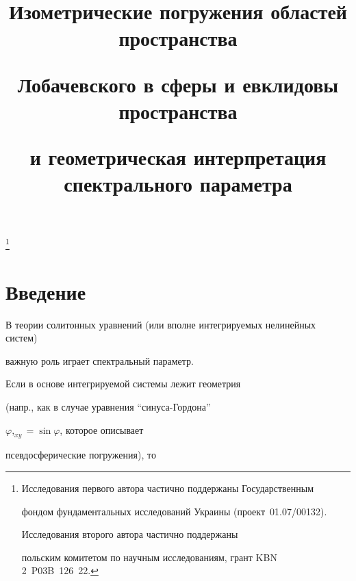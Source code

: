 

\title{Изометрические погружения областей пространства


Лобачевского в сферы и евклидовы пространства


и геометрическая интерпретация спектрального параметра}


\thanks{Исследования первого автора частично поддержаны Государственным


фондом фундаментальных исследований Украины (проект \No\,01.07/00132).


Исследования второго автора частично поддержаны


польским комитетом по научным исследованиям, грант KBN \No\,2~P03B~126~22.}





\date{}




\pagestyle{plain} %







\maketitle


\label{begin}











\section{Введение}





В теории солитонных уравнений (или вполне интегрируемых нелинейных систем) 


\cite{ZMNP} важную роль играет спектральный параметр.


Если в основе интегрируемой системы лежит геометрия


(напр., как в случае уравнения ``синуса-Гордона''


$\varphi,_{xy} = \sin\varphi$, которое описывает


псевдосферические погружения), то


